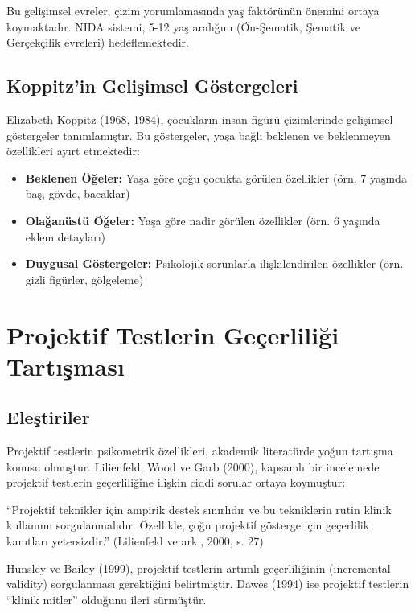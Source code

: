Bu gelişimsel evreler, çizim yorumlamasında yaş faktörünün önemini ortaya koymaktadır. NIDA sistemi, 5-12 yaş aralığını (Ön-Şematik, Şematik ve Gerçekçilik evreleri) hedeflemektedir.

\subsection{Koppitz'in Gelişimsel Göstergeleri}

Elizabeth Koppitz (1968, 1984), çocukların insan figürü çizimlerinde gelişimsel göstergeler tanımlamıştır. Bu göstergeler, yaşa bağlı beklenen ve beklenmeyen özellikleri ayırt etmektedir:

\begin{itemize}
  \item \textbf{Beklenen Öğeler:} Yaşa göre çoğu çocukta görülen özellikler (örn. 7 yaşında baş, gövde, bacaklar)
  \item \textbf{Olağanüstü Öğeler:} Yaşa göre nadir görülen özellikler (örn. 6 yaşında eklem detayları)
  \item \textbf{Duygusal Göstergeler:} Psikolojik sorunlarla ilişkilendirilen özellikler (örn. gizli figürler, gölgeleme)
\end{itemize}

\section{Projektif Testlerin Geçerliliği Tartışması}

\subsection{Eleştiriler}

Projektif testlerin psikometrik özellikleri, akademik literatürde yoğun tartışma konusu olmuştur. Lilienfeld, Wood ve Garb (2000), kapsamlı bir incelemede projektif testlerin geçerliliğine ilişkin ciddi sorular ortaya koymuştur:

\begin{quotebox}
``Projektif teknikler için ampirik destek sınırlıdır ve bu tekniklerin rutin klinik kullanımı sorgulanmalıdır. Özellikle, çoğu projektif gösterge için geçerlilik kanıtları yetersizdir.'' (Lilienfeld ve ark., 2000, s. 27)
\end{quotebox}

Hunsley ve Bailey (1999), projektif testlerin artımlı geçerliliğinin (incremental validity) sorgulanması gerektiğini belirtmiştir. Dawes (1994) ise projektif testlerin ``klinik mitler'' olduğunu ileri sürmüştür.

